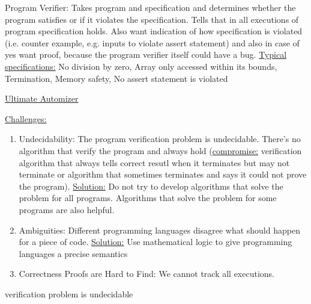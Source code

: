 \documentclass[landscape, a4paper]{article}
\begin{document}
\fontsize{3pt}{3pt}\selectfont

\begin{minipage}[t]{0.2\linewidth}
	  
	\begin{betterlist}
		\item \alert{Program Verifier:} Takes program and specification and determines whether the program satisfies or if it violates the specification. Tells that in all executions of program specification holds. Also want indication of how specification is violated (i.e. counter example, e.g. inputs to violate assert statement) and also in case of yes want proof, because the program verifier itself could have a bug. \underline{Typical specifications:} No division by zero, Array only accessed within its bounds, Termination, Memory safety, No assert statement is violated
		\item \href{https://ultimate-pa.org/?ui=tool&tool=automizer}{Ultimate Automizer}
		\item \underline{Challenges:}
		\begin{enumerate}
			\item \alert{Undecidability:} The program verification problem is undecidable. There's no algorithm that verify the program and always hold (\underline{compromise:} verification algorithm that always tells correct resutl when it terminates but may not terminate or algorithm that sometimes terminates and says it could not prove the program). \underline{Solution:} Do not try to develop algorithms that solve the problem for all programs. Algorithms that solve the problem for some programs are also helpful.
			\item \alert{Ambiguities:} Different programming languages disagree what should happen for a piece of code. \underline{Solution:} Use mathematical logic to give programming languages a precise semantics
			\item \alert{Correctness Proofs are Hard to Find:} We cannot track all executions.
		\end{enumerate}
		\item verification problem is undecidable
	\end{betterlist}
	  

\end{minipage}
\end{document}
